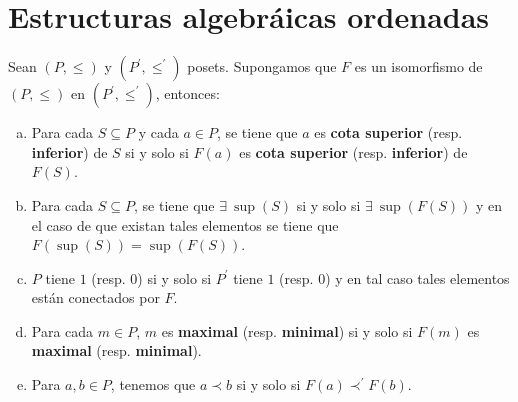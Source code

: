 \section{Estructuras algebráicas ordenadas}

  \begin{lemma}
    \PN Sean $(P, \leq)$ y $(P^{\prime}, \leq^{\prime})$ posets. Supongamos que $F$ es un isomorfismo de $(P, \leq)$ en
    $(P^{\prime}, \leq^{\prime})$, entonces:

    \begin{enumerate}[a)]
      \item Para cada $S \subseteq P$ y cada $a \in P$, se tiene que $a$ es \textbf{cota superior} (resp.
        \textbf{inferior}) de $S$ si y solo si $F(a)$ es \textbf{cota superior} (resp. \textbf{inferior}) de $F(S)$.
      \item Para cada $S \subseteq P$, se tiene que $\exists \ \sup (S)$ si y solo si $\exists \ \sup (F(S))$ y en el
        caso de que existan tales elementos se tiene que $F(\sup (S)) = \sup (F(S))$.
      \item $P$ tiene $1$ (resp. $0$) si y solo si $P^{\prime }$ tiene $1$ (resp. $0$) y en tal caso tales elementos
        están conectados por $F$.
      \item Para cada $m \in P$, $m$ es \textbf{maximal} (resp. \textbf{minimal}) si y solo si $F(m)$ es
        \textbf{maximal} (resp. \textbf{minimal}).
      \item Para $a, b \in P$, tenemos que $a \prec b$ si y solo si $F(a) \prec^{\prime} F(b)$.
    \end{enumerate}
  \end{lemma}
